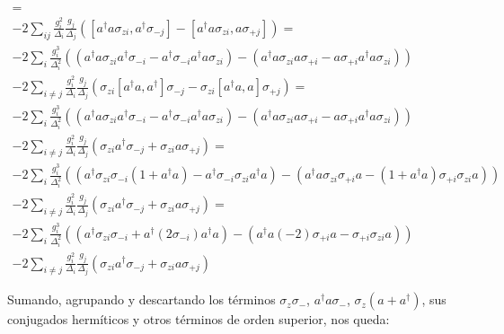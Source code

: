 \begin{multline}
[- 2 \sum\limits_{i} \frac{g_i^2}{\Delta_i} a^\dagger a \sigma_{zi}, \sum\limits_j \frac{g_j} {\Delta_j} (a^\dagger \sigma_{-j} - a \sigma_{+j})] = \\
- 2 \sum\limits_{ij} \frac{g_i^2}{\Delta_i} \frac{g_j}{\Delta_j} \left(
[a^\dagger a \sigma_{zi}, a^\dagger \sigma_{-j}] -
[a^\dagger a \sigma_{zi}, a \sigma_{+j}]
\right) = \\
- 2 \sum\limits_{i} \frac{g_i^3}{\Delta_i^2} \left(
(a^\dagger a \sigma_{zi} a^\dagger \sigma_{-i} - a^\dagger \sigma_{-i} a^\dagger a \sigma_{zi}) -
(a^\dagger a \sigma_{zi} a \sigma_{+i} - a \sigma_{+i} a^\dagger a \sigma_{zi})
\right) \\
- 2 \sum\limits_{i \neq j} \frac{g_i^2}{\Delta_i} \frac{g_j}{\Delta_j} \left(
\sigma_{zi} [a^\dagger a, a^\dagger] \sigma_{-j} -
\sigma_{zi} [a^\dagger a, a] \sigma_{+j}
\right) = \\
- 2 \sum\limits_{i} \frac{g_i^3}{\Delta_i^2} \left(
(a^\dagger a \sigma_{zi} a^\dagger \sigma_{-i} - a^\dagger \sigma_{-i} a^\dagger a \sigma_{zi}) -
(a^\dagger a \sigma_{zi} a \sigma_{+i} - a \sigma_{+i} a^\dagger a \sigma_{zi})
\right) \\
- 2 \sum\limits_{i \neq j} \frac{g_i^2}{\Delta_i} \frac{g_j}{\Delta_j} \left(
\sigma_{zi} a^\dagger \sigma_{-j} +
\sigma_{zi} a \sigma_{+j}
\right) = \\
- 2 \sum\limits_{i} \frac{g_i^3}{\Delta_i^2} \left(
(a^\dagger \sigma_{zi} \sigma_{-i} (1 + a^\dagger a) - a^\dagger \sigma_{-i} \sigma_{zi} a^\dagger a) -
(a^\dagger a \sigma_{zi} \sigma_{+i} a - (1 + a^\dagger a) \sigma_{+i} \sigma_{zi} a)
\right) \\
- 2 \sum\limits_{i \neq j} \frac{g_i^2}{\Delta_i} \frac{g_j}{\Delta_j} \left(
\sigma_{zi} a^\dagger \sigma_{-j} +
\sigma_{zi} a \sigma_{+j}
\right) = \\
- 2 \sum\limits_{i} \frac{g_i^3}{\Delta_i^2} \left(
(a^\dagger \sigma_{zi} \sigma_{-i} + a^\dagger (2 \sigma_{-i}) a^\dagger a) -
(a^\dagger a (-2) \sigma_{+i} a - \sigma_{+i} \sigma_{zi} a)
\right) \\
- 2 \sum\limits_{i \neq j} \frac{g_i^2}{\Delta_i} \frac{g_j}{\Delta_j} \left(
\sigma_{zi} a^\dagger \sigma_{-j} +
\sigma_{zi} a \sigma_{+j}
\right)
\end{multline}

\color{red}
Sumando, agrupando y descartando los términos $\sigma_z \sigma_-$, $a^\dagger a \sigma_-$, $\sigma_z (a + a^\dagger)$, sus conjugados hermíticos y otros términos de orden superior, nos queda:
\color{black}

